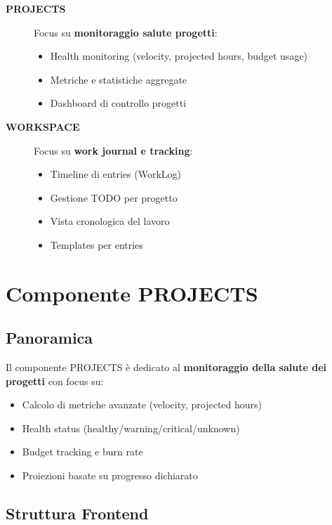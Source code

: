 \documentclass[11pt,a4paper]{article}
\begin{document}
\begin{description}
    \item[\textbf{PROJECTS}] Focus su \textbf{monitoraggio salute progetti}:
    \begin{itemize}
        \item Health monitoring (velocity, projected hours, budget usage)
        \item Metriche e statistiche aggregate
        \item Dashboard di controllo progetti
    \end{itemize}
    
    \item[\textbf{WORKSPACE}] Focus su \textbf{work journal e tracking}:
    \begin{itemize}
        \item Timeline di entries (WorkLog)
        \item Gestione TODO per progetto
        \item Vista cronologica del lavoro
        \item Templates per entries
    \end{itemize}
\end{description}

\newpage

\section{Componente PROJECTS}

\subsection{Panoramica}

Il componente PROJECTS è dedicato al \textbf{monitoraggio della salute dei progetti} con focus su:
\begin{itemize}
    \item Calcolo di metriche avanzate (velocity, projected hours)
    \item Health status (healthy/warning/critical/unknown)
    \item Budget tracking e burn rate
    \item Proiezioni basate su progresso dichiarato
\end{itemize}

\subsection{Struttura Frontend}
\end{document}
